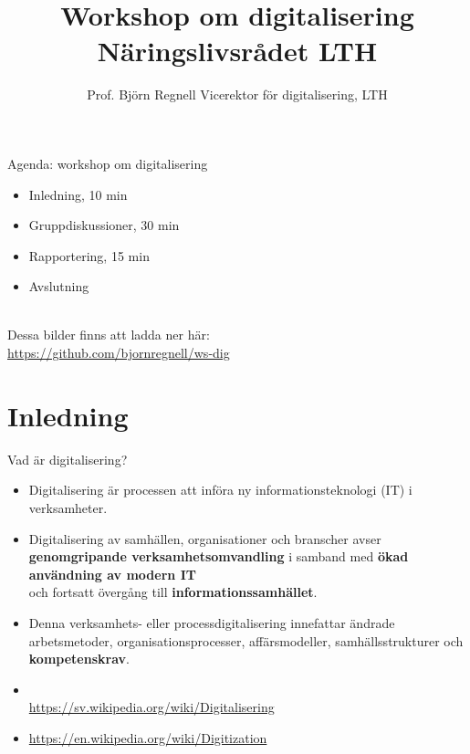 \documentclass[aspectratio=169]{beamer}
\title[B. Regnell, \today]{\selectfont Workshop om digitalisering \\ Näringslivsrådet LTH }
\author[\href{https://github.com/bjornregnell/ws-dig}{github.com/bjornregnell/ws-dig}]{%
  Prof. Björn Regnell\newline
  Vicerektor för digitalisering, LTH}
\newcommand{\TitleSlide}{\begin{frame}[plain]\titlepage\end{frame}}
\newenvironment{Slide}[1]%
  {\begin{frame}[environment=Slide]{#1}}
  {\end{frame}}%
\begin{document}
\TitleSlide


\begin{Slide}{Agenda: workshop om digitalisering}
\begin{itemize}
    \item Inledning, 10 min 
    \item Gruppdiskussioner, 30 min 
    \item Rapportering, 15 min 
    \item Avslutning
\end{itemize}

~\\Dessa bilder finns att ladda ner här: \\ 
\url{https://github.com/bjornregnell/ws-dig}
\end{Slide}

\section{Inledning}
\begin{Slide}{Vad är digitalisering?}
  \begin{itemize}\small
      \item Digitalisering är processen att införa ny informationsteknologi (IT) i
      verksamheter. 
      \item Digitalisering av samhällen, organisationer och
      branscher avser \textbf{genomgripande verksamhetsomvandling} i samband
      med \textbf{ökad användning av modern IT} \\ och fortsatt övergång till
      \textbf{informationssamhället}. 
      
      \item Denna verksamhets- eller processdigitalisering innefattar ändrade arbetsmetoder,
      organisationsprocesser, affärsmodeller, samhällsstrukturer och
      \textbf{kompetenskrav}.
    \end{itemize}

    \begin{itemize}\small
      \item[]  ~\\\url{https://sv.wikipedia.org/wiki/Digitalisering}
      \item[]  \url{https://en.wikipedia.org/wiki/Digitization}
  \end{itemize}
\end{Slide}
\end{document}
